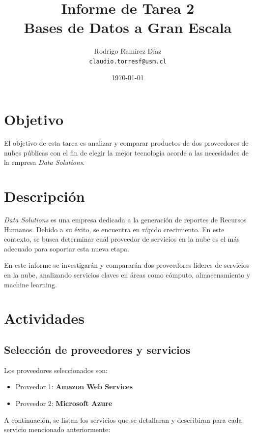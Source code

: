 \documentclass[12pt]{article}
\title{\textbf{Informe de Tarea 2}\\Bases de Datos a Gran Escala}
\author{Rodrigo Ramírez Díaz\\
	\texttt{claudio.torresf@usm.cl}}
\date{\today}
\begin{document}
	
	\maketitle
	
	\section{Objetivo}
	El objetivo de esta tarea es analizar y comparar productos de dos proveedores de nubes públicas con el fin de elegir la mejor tecnología acorde a las necesidades de la empresa \textit{Data Solutions}.
	
	\section{Descripción}
	\textit{Data Solutions} es una empresa dedicada a la generación de reportes de Recursos Humanos. Debido a su éxito, se encuentra en rápido crecimiento. En este contexto, se busca determinar cuál proveedor de servicios en la nube es el más adecuado para soportar esta nueva etapa.
	
	En este informe se investigarán y compararán dos proveedores líderes de servicios en la nube, analizando servicios claves en áreas como cómputo, almacenamiento y machine learning.
	
	\section{Actividades}
	
	\subsection{Selección de proveedores y servicios}
	Los proveedores seleccionados son:
	
	\begin{itemize}
		\item Proveedor 1: \textbf{Amazon Web Services}
		\item Proveedor 2: \textbf{Microsoft Azure}
	\end{itemize}
	
	A continuación, se listan los servicios que se detallaran y describiran para cada servicio mencionado anteriormente:
	
\end{document}
